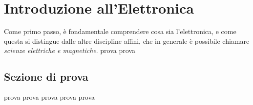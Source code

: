 \chapter[prova]{Introduzione all'Elettronica}
\label{chap:introduzione}
Come primo passo, è fondamentale comprendere cosa sia l'elettronica, e come
questa si distingue dalle altre discipline affini, che in generale è possibile
chiamare \emph{scienze elettriche e magnetiche}.
\newpage
prova
\newpage
prova
\section[secprova]{Sezione di prova}
prova
\newpage
prova
\newpage
prova
\newpage
prova
\newpage
prova

